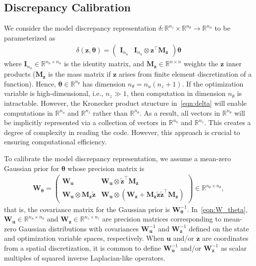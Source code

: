 \documentclass[11pt]{article}
\newcommand{\R}{\mathbb{R}}
\renewcommand{\u}{\bm{u}}
\renewcommand{\t}{\bm{\theta}}
\newcommand{\z}{\bm{z}}
\newcommand{\0}{\bm{0}}
\newcommand{\M}{\bm{M}}
\newcommand{\I}{\bm{I}}
\newcommand{\W}{\bm{W}}
\newcommand{\ztilde}{\tilde{\z}}
\renewcommand{\d}{\delta}
\begin{document}
\subsection*{Discrepancy Calibration}
We consider the model discrepancy representation $\d:\R^{n_z} \times \R^{n_\theta} \to \R^{n_u}$ to be parameterized as
\begin{eqnarray} \label{eqn:delta}
\d(\z,\t) =
\left( \begin{array}{cc}
\I_{n_u} & \I_{n_u} \otimes \z^\top \M_{\z}
\end{array} \right)
 \t
\end{eqnarray}
where $\I_{n_u} \in \R^{n_u \times n_u}$ is the identity matrix, and $\M_{\z} \in \R^{n \times n}$ weights the $\z$ inner products ($\M_{\z}$ is the mass matrix if $\z$ arises from finite element discretization of a function). Hence, $\t \in \R^{n_\theta}$ has dimension $n_\theta = n_u (n_z+1)$. If the optimization variable is high-dimensional, i.e., $n_z \gg 1$, then computation in dimension $n_\theta$ is intractable. However, the Kronecker product structure in~\eqref{eqn:delta} will enable computations in $\R^{n_u}$ and $\R^{n_z}$ rather than $\R^{n_\theta}$. As a result, all vectors in $\R^{n_\theta}$ will be implicitly represented via a collection of vectors in $\R^{n_u}$ and $\R^{n_z}$. This creates a degree of complexity in reading the code. However, this approach is crucial to ensuring computational efficiency.

To calibrate the model discrepancy representation, we assume a mean-zero Gaussian prior for $\t$ whose precision matrix is
\begin{eqnarray} \label{eqn:W_theta}
\W_{\t} =  \left( \begin{array}{cc}
\W_{\u} & \W_{\u} \otimes \ztilde^\top \M_{\z} \\
\W_{\u} \otimes \M_{\z} \ztilde & \W_{\u} \otimes (\W_{\z}+ \M_{\z} \ztilde  \ztilde^\top \M_{\z} )
\end{array} \right)  \in \R^{n_\theta \times n_\theta},
\end{eqnarray} 
that is, the covariance matrix for the Gaussian prior is $\W_{\t}^{-1}$. In~\eqref{eqn:W_theta}, $\W_{\u} \in \R^{n_u \times n_u}$ and $\W_{\z} \in \R^{n_z \times n_z}$ are precision matrices corresponding to mean-zero Gaussian distributions with covariances $\W_{\u}^{-1}$ and $\W_{\z}^{-1}$ defined on the state and optimization variable spaces, respectively. When $\u$ and/or $\z$ are coordinates from a spatial discretization, it is common to define $\W_{\u}^{-1}$ and/or $\W_{\z}^{-1}$ as scalar multiples of squared inverse Laplacian-like operators.
\end{document}
